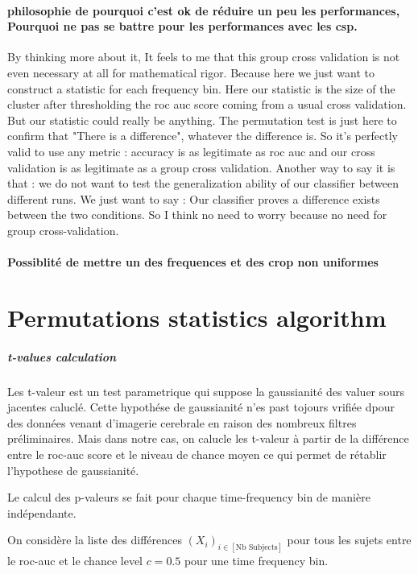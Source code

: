 \paragraph{philosophie de pourquoi c'est ok de réduire un peu les performances, Pourquoi ne pas se battre pour les performances avec les csp.}

By thinking more about it, It feels to me that this group cross validation is not even necessary at all for mathematical rigor. Because here we just want to construct a statistic for each frequency bin. Here our statistic is the size of the cluster after thresholding the roc auc score coming from a usual cross validation. But our statistic could really be anything. The permutation test is just here to confirm that "There is a difference", whatever the difference is. So it's perfectly valid to use any metric : accuracy is as legitimate as roc auc and our cross validation is as legitimate as a group cross validation.
Another way to say it is that : we do not want to test the generalization ability of our classifier between different runs. We just want to say : Our classifier proves a difference exists between the two conditions.
So I think no need to worry because no need for group cross-validation.


\paragraph{Possiblité de mettre un des frequences et des crop non uniformes}




\section{Permutations statistics algorithm}

\subparagraph{t-values calculation}

Les t-valeur est un test parametrique qui suppose la gaussianité des valuer sours jacentes caluclé. Cette hypothése de gaussianité n'es past tojours vrifiée dpour des données venant d'imagerie cerebrale en raison des nombreux filtres préliminaires. Mais dans notre cas, on calucle les t-valeur à partir de la différence entre le roc-auc score et le niveau de chance moyen ce qui permet de rétablir l'hypothese de gaussianité.

Le calcul des p-valeurs se fait pour chaque time-frequency bin de manière indépendante.

On considère la liste des différences $(X_i)_{i \in [\text{Nb Subjects}]}$ pour tous les sujets entre le roc-auc et le chance level $c=0.5$ pour une time frequency bin.

